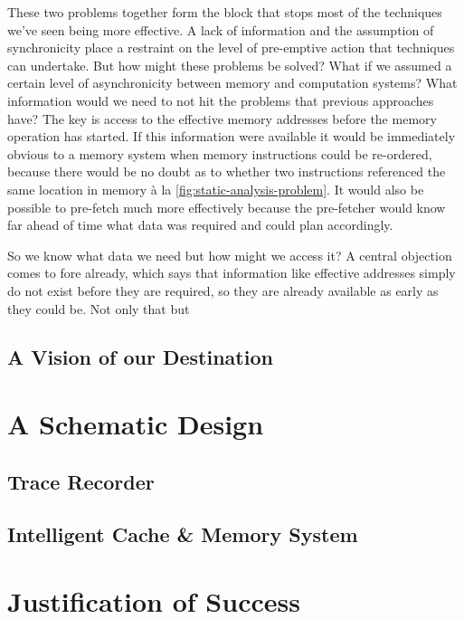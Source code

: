 These two problems together form the block that stops most of the techniques we've seen being more effective. A lack of information and the assumption of synchronicity place a restraint on the level of pre-emptive action that techniques can undertake. But how might these problems be solved? What if we assumed a certain level of asynchronicity between memory and computation systems? What information would we need to not hit the problems that previous approaches have? The key is access to the effective memory addresses before the memory operation has started. If this information were available it would be immediately obvious to a memory system when memory instructions could be re-ordered, because there would be no doubt as to whether two instructions referenced the same location in memory à la \ref{fig:static-analysis-problem}. It would also be possible to pre-fetch much more effectively because the pre-fetcher would know far ahead of time what data was required and could plan accordingly. 


So we know what data we need but how might we access it? A central objection comes to fore already, which says that information like effective addresses simply do not exist before they are required, so they are already available as early as they could be. Not only that but 


\subsection{A Vision of our Destination}

\section{A Schematic Design}

\subsection{Trace Recorder}

\subsection{Intelligent Cache \& Memory System}

\section{Justification of Success}